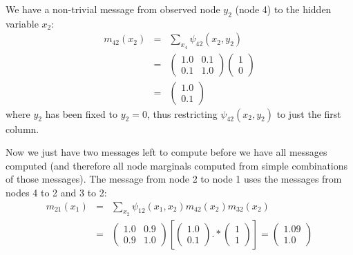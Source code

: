 We have a non-trivial message from observed node $y_2$ (node 4) to the hidden
variable $x_2$:
\begin{eqnarray}
m_{42}(x_2) & = & \sum_{x_4} \psi_{42} (x_2, y_2)  \\
& = & 
\left( 
\begin{array}{cc}
1.0 & 0.1 \\
0.1 & 1.0 
\end{array}
\right)  
\left( 
\begin{array}{c}
1 \\
0
\end{array}
\right) 
\\
& = &
\left( 
\begin{array}{c}
1.0 \\
0.1
\end{array}
\right) 
\end{eqnarray}
where $y_2$ has been fixed to $y_2 = 0$, thus restricting $\psi_{42}
(x_2, y_2) $ to just the first column.

Now we just have two messages left to compute before we have all
messages computed (and therefore all node marginals computed from
simple combinations of those messages).  
The message from node 2 to node 1 uses the messages from nodes 4 to 2
and 3 to 2:
\begin{eqnarray}
m_{21}(x_1) & = & \sum_{x_2} \psi_{12} (x_1, x_2)  m_{42}(x_2) m_{32}(x_2) \\
& = & 
\left( 
\begin{array}{cc}
1.0 & 0.9 \\
0.9 & 1.0 
\end{array}
\right) 
\left[
\left( 
\begin{array}{c}
1.0 \\
0.1
\end{array}
\right) 
.*
\left( 
\begin{array}{c}
1 \\
1
\end{array}
\right) 
\right]
=
\left( 
\begin{array}{c}
1.09 \\
1.0
\end{array}
\right) 
\end{eqnarray}

